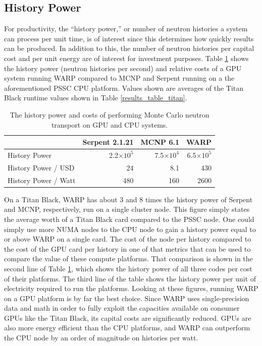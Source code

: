 \documentclass[preprint,12pt]{elsarticle}
\begin{document}
\newpage
\subsection{History Power}

For productivity, the ``history power,'' or  number of neutron histories a system can process per unit time, is of interest since this determines how quickly results can be produced.  In addition to this, the number of neutron histories per capital cost and per unit energy are of interest for investment purposes.  Table \ref{history_power} shows the history power (neutron histories per second) and relative costs of a GPU system running WARP compared to MCNP and Serpent running on a the aforementioned PSSC CPU platform.  Values shown are averages of the Titan Black runtime values shown in Table \ref{results_table_titan}.

\begin{table}[h]
\centering
\caption{The history power and costs of performing Monte Carlo neutron transport on GPU and CPU systems.}
\label{history_power}
\small
\begin{tabular}{| l | r | r | r |}
\hline
              &  Serpent 2.1.21 & MCNP 6.1 & WARP  \\
\hline
History Power   &  2.2$\times10^5$	 & 7.5$\times10^4$	 & 6.5$\times10^5$    \\
\hline
History Power / USD    & 24 & 	8.1	 & 430    \\
\hline
History Power / Watt   & 480	 & 160	 & 2600    \\
\hline
\end{tabular}
\end{table}

On a Titan Black, WARP has about 3 and 8 times the history power of Serpent and MCNP, respectively, run on a single cluster node.  This figure simply states the average worth of a Titan Black card compared to the PSSC node.  One could simply use more NUMA nodes to the CPU node to gain a history power equal to or above WARP on a single card. 
 The cost of the node per history compared to the cost of the GPU card per history  in one of that metrics that can be used to compare the value of these compute platforms.  That comparison is shown in the second line of Table \ref{history_power}, which shows the history power of all three codes per cost of their platforms.  The third line of the table shows the history power per unit of electricity required to run the platforms.  Looking at these figures, running WARP on a GPU platform is by far the best choice.  Since WARP uses single-precision data and math in order to fully exploit the capacities available on consumer GPUs like the Titan Black, its capital costs are significantly reduced.  GPUs are also more energy efficient than the CPU platforms, and WARP can outperform the CPU node by an order of magnitude on histories per watt.
\end{document}
